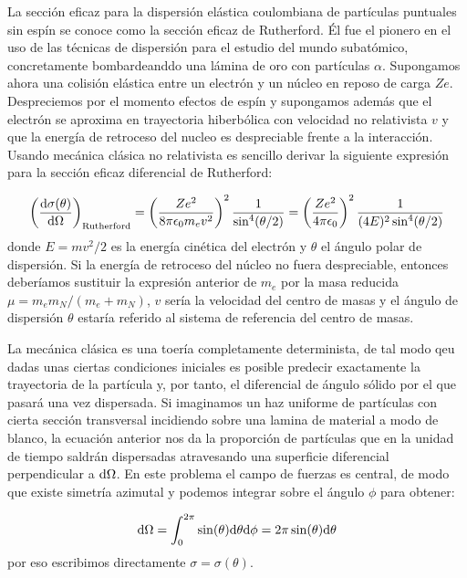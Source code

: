 La sección eficaz para la dispersión elástica coulombiana de partículas puntuales sin espín se conoce como la sección eficaz de Rutherford. Él fue el pionero en el uso de las técnicas de dispersión para el estudio del mundo subatómico, concretamente bombardeanddo una lámina de oro con partículas $\alpha$. Supongamos ahora una colisión elástica entre un electrón y un núcleo en reposo de carga $Ze$. Despreciemos por el momento efectos de espín y supongamos además que el electrón se aproxima en trayectoria hiberbólica con velocidad no relativista $v$ y que la energía de retroceso del nucleo es despreciable frente a la interacción. Usando mecánica clásica no relativista es sencillo derivar la siguiente expresión para la sección eficaz diferencial de Rutherford:

\begin{equation}
	\left( \frac{\mathrm{d} \sigma(\theta)}{\mathrm{d} \Omega} \right)_{\text{Rutherford}} = \left( \frac{Ze^2}{8 \pi \epsilon_0 m_e v^2} \right)^2 \frac{1}{\sin^4 (\theta/2)} = \left( \frac{Ze^2}{ 4 \pi \epsilon_0} \right)^2 \frac{1}{(4E)^2\sin^4 (\theta/2)}
\end{equation}
donde $E=mv^2/2$ es la energía cinética del electrón y $\theta$ el ángulo polar de dispersión. Si la energía de retroceso del núcleo no fuera despreciable, entonces deberíamos sustituir la expresión anterior de $m_e$ por la masa reducida $\mu=m_em_N / (m_e+m_N)$, $v$ sería la velocidad del centro de masas y el ángulo de dispersión $\theta$ estaría referido al sistema de referencia del centro de masas.

La mecánica clásica es una toería completamente determinista, de tal modo qeu dadas unas ciertas condiciones iniciales es posible predecir exactamente la trayectoria de la partícula y, por tanto, el diferencial de ángulo sólido por el que pasará una vez dispersada. Si imaginamos un haz uniforme de partículas con cierta sección transversal incidiendo sobre una lamina de material a modo de blanco, la ecuación anterior nos da la proporción de partículas que en la unidad de tiempo saldrán dispersadas atravesando una superficie diferencial perpendicular a $\mathrm{d} \Omega$. En este problema el campo de fuerzas es central, de modo que existe simetría azimutal y podemos integrar sobre el ángulo $\phi$ para obtener:

\begin{equation}
	\mathrm{d} \Omega = \int_0^{2\pi} \sin (\theta) \mathrm{d} \theta \mathrm{d} \phi = 2 \pi \sin (\theta) \mathrm{d} \theta
\end{equation}
por eso escribimos directamente $\sigma = \sigma (\theta)$.


